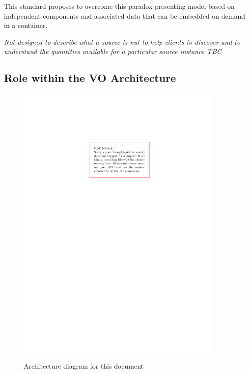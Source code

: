 \documentclass[11pt,a4paper]{ivoa}
\begin{document}
This standard proposes to overcome this paradox presenting model based on independent components and associated data that can be embedded on demand in a container.

\emph{Not designed to describe what a source is nut to help clients to discover and to understand the quantities available for a particular source instance TBC}

\subsection{Role within the VO Architecture}

\begin{figure}
\centering


\includegraphics[width=0.9\textwidth]{role_diagram.pdf}
\caption{Architecture diagram for this document}
\label{fig:archdiag}
\end{figure}
\end{document}
